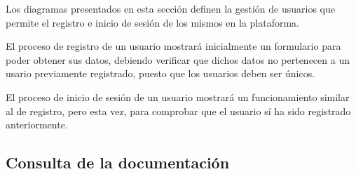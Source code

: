             Los diagramas presentados en esta sección definen la gestión de usuarios que permite el registro e inicio de sesión de los mismos en la plataforma.
            
            El proceso de registro de un usuario mostrará inicialmente un formulario para poder obtener sus datos, debiendo verificar que dichos datos no pertenecen a un usario previamente registrado, puesto que los usuarios deben ser únicos.
            
            El proceso de inicio de sesión de un usuario mostrará un funcionamiento similar al de registro, pero esta vez, para comprobar que el usuario sí ha sido registrado anteriormente.
            
            \newpage
            
        \subsection{Consulta de la documentación}
            \label{sec:consulta-documentacion}
            

